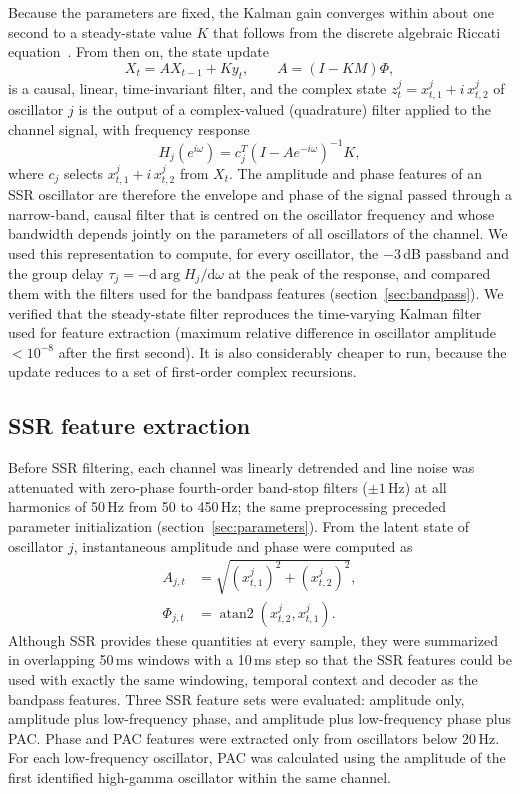 \documentclass{iopjournal}
\begin{document}
Because the parameters are fixed, the Kalman gain converges within about one second to a steady-state value $K$ that follows from the discrete algebraic Riccati equation~\cite{Anderson1979}. From then on, the state update
\begin{equation}
    X_t = A X_{t-1} + K y_t, \qquad A=(I-KM)\Phi,
\end{equation}
is a causal, linear, time-invariant filter, and the complex state $z_t^j=x_{t,1}^j+i\,x_{t,2}^j$ of oscillator $j$ is the output of a complex-valued (quadrature) filter applied to the channel signal, with frequency response
\begin{equation}
    H_j(e^{i\omega}) = c_j^{T}\left(I - A e^{-i\omega}\right)^{-1}K,
\end{equation}
where $c_j$ selects $x_{t,1}^j+i\,x_{t,2}^j$ from $X_t$. The amplitude and phase features of an SSR oscillator are therefore the envelope and phase of the signal passed through a narrow-band, causal filter that is centred on the oscillator frequency and whose bandwidth depends jointly on the parameters of all oscillators of the channel. We used this representation to compute, for every oscillator, the $-3$\,dB passband and the group delay $\tau_j=-\mathrm{d}\arg H_j/\mathrm{d}\omega$ at the peak of the response, and compared them with the filters used for the bandpass features (section~\ref{sec:bandpass}). We verified that the steady-state filter reproduces the time-varying Kalman filter used for feature extraction (maximum relative difference in oscillator amplitude $<10^{-8}$ after the first second). It is also considerably cheaper to run, because the update reduces to a set of first-order complex recursions.

\subsection{SSR feature extraction}

Before SSR filtering, each channel was linearly detrended and line noise was attenuated with zero-phase fourth-order band-stop filters ($\pm1$\,Hz) at all harmonics of 50\,Hz from 50 to 450\,Hz; the same preprocessing preceded parameter initialization (section~\ref{sec:parameters}). From the latent state of oscillator $j$, instantaneous amplitude and phase were computed as
\begin{align}
    A_{j,t} &= \sqrt{(x_{t,1}^j)^2+(x_{t,2}^j)^2}, \\
    \Phi_{j,t} &= \operatorname{atan2}(x_{t,2}^j,x_{t,1}^j).
\end{align}
Although SSR provides these quantities at every sample, they were summarized in overlapping 50\,ms windows with a 10\,ms step so that the SSR features could be used with exactly the same windowing, temporal context and decoder as the bandpass features. Three SSR feature sets were evaluated: amplitude only, amplitude plus low-frequency phase, and amplitude plus low-frequency phase plus PAC. Phase and PAC features were extracted only from oscillators below 20\,Hz. For each low-frequency oscillator, PAC was calculated using the amplitude of the first identified high-gamma oscillator within the same channel.
\end{document}
